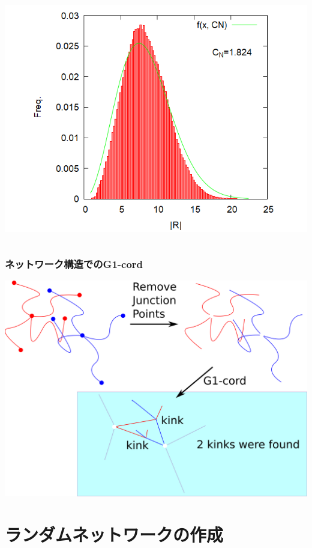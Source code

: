 \documentclass[12pt, dvipdfmx]{beamer}
\begin{document}
\begin{frame}
\begin{columns}[T, onlytextwidth]
\begin{itemize}
					\includegraphics[width=.64\textwidth]{R_N48_f4.png}
				\end{itemize}
		\end{columns}
\end{frame}

\begin{frame}
	\frametitle{ネットワーク構造でのG1-cord}
		\begin{center}
			\includegraphics[width=.8\textwidth]{g1cord.png}
		\end{center}
\end{frame}

\section{ランダムネットワークの作成}
\end{document}
